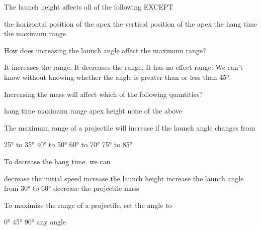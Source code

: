 \documentclass[../main-physics-problems.tex]{subfiles}
\begin{document}
\begin{questions}
\question
The launch height affects all of the following EXCEPT

\begin{randomizechoices}
    \correctchoice the horizontal position of the apex
    \choice the vertical position of the apex
    \choice the hang time
    \choice the maximum range
\end{randomizechoices}

\question
How does increasing the launch angle affect the maximum range?

\begin{randomizechoices}[keeplast]
    \choice It increases the range.
    \choice It decreases the range.
    \choice It has no effect range.
    \correctchoice We can't know without knowing whether the angle is greater than or less than \ang{45}.
\end{randomizechoices}

\question
Increasing the mass will affect which of the following quantities?

\begin{randomizechoices}[keeplast]
    \choice hang time
    \choice maximum range
    \choice apex height
    \correctchoice none of the above
\end{randomizechoices}

\question
The maximum range of a projectile will increase if the launch angle changes from 

\begin{randomizechoices}
    \correctchoice \ang{25} to \ang{35}
    \choice \ang{40} to \ang{50}
    \choice \ang{60} to \ang{70}
    \choice \ang{75} to \ang{85}
\end{randomizechoices}

\question
To decrease the hang time, we can

\begin{randomizechoices}
    \correctchoice decrease the initial speed
    \choice increase the launch height
    \choice increase the launch angle from \ang{30} to \ang{60}
    \choice decrease the projectile mass
\end{randomizechoices}

\question
To maximize the range of a projectile, set the angle to 

\begin{randomizechoices}
    \choice \ang{0}
    \correctchoice \ang{45}
    \choice \ang{90}
    \choice any angle
\end{randomizechoices}
\end{questions}
\end{document}
